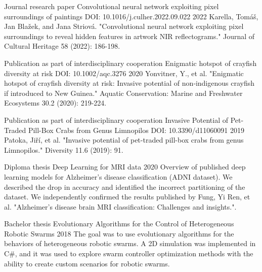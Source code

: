 

\begin{cventries}


    \cventry
    {Journal research paper} %
    {Convolutional neural network exploiting pixel surroundings of paintings} %
    {DOI: 10.1016/j.culher.2022.09.022} %
    {2022} %
    {
    Karella, Tomáš, Jan Blažek, and Jana Striová. "Convolutional neural network exploiting pixel surroundings to reveal hidden features in artwork NIR reflectograms." Journal of Cultural Heritage 58 (2022): 186-198.
    }
    
    \cventry
    {Publication as part of interdisciplinary cooperation} %
    {Enigmatic hotspot of crayfish diversity at risk} %
    {DOI: 10.1002/aqc.3276} %
    {2020} %
    {
        Yonvitner, Y., et al. "Enigmatic hotspot of crayfish diversity at risk: Invasive potential of non‐indigenous crayfish if introduced to New Guinea." Aquatic Conservation: Marine and Freshwater Ecosystems 30.2 (2020): 219-224.
    }
    
    \cventry
    {Publication as part of interdisciplinary cooperation} %
    {Invasive Potential of Pet-Traded Pill-Box Crabs from Genus Limnopilos} %
    {DOI: 10.3390/d11060091} %
    {2019} %
    {
    Patoka, Jiří, et al. "Invasive potential of pet-traded pill-box crabs from genus Limnopilos." Diversity 11.6 (2019): 91.
    }

    \cventry
    {Diploma thesis} %
    {Deep Learning for MRI data} %
    {} %
    {2020} %
    {Overview of published deep learning models for Alzheimer's disease classification (ADNI dataset). We described the drop in accuracy and identified the incorrect partitioning of the dataset. We independently confirmed the results published by Fung, Yi Ren, et al. "Alzheimer's disease brain MRI classification: Challenges and insights.". 
    }
    
    \cventry
    {Bachelor thesis} %
    {Evolutionary Algorithms for the Control of Heterogeneous Robotic Swarms} %
    {} %
    {2018} %
    {
The goal was to use evolutionary algorithms for the behaviors of heterogeneous robotic swarms. A 2D simulation was implemented in C\#, and it was used to explore swarm controller optimization methods with the ability to create custom scenarios for robotic swarms.
    }



\end{cventries}
